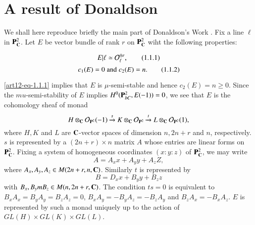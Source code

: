 \section{A result of Donaldson}\label{art12-sec-1}
We shall here reproduce briefly the main part of Donaldson's Work \cite{art12-key1}. Fix a line $\ell$ in $\mathbf{P}_{\mathbf{C}}^{2}$. Let $E$ be vector bundle of rank $r$ on $\mathbf{P}_{\mathbf{C}}^{2}$ wiht the following properties:


\begin{equation}
E|\ell \simeq \mathcal{O}_{\ell}^{\oplus r},\tag{1.1.1} \label{art12-eq-1.1.1}
\end{equation}
\begin{equation}
c_{1} (E) =0 \;{\rm and}\; c_{2}(E) =n.\tag{1.1.2}\label{art12-eq-1.1.2}
\end{equation}

\noindent
\eqref{art12-eq-1.1.1} implies that $E$ is $\mu$-semi-stable and hence $c_{2}(E)= n \geq 0$. Since the $mu$-semi-stability of $E$ implies $H^{0}(\mathbf{P}_{bC}^{2}, E(-1))=0$, we see that $E$ is the cohomology sheaf of monad
$$
H\otimes_{\mathbf{C}} \mathcal{O}_{\mathbf{P}^{2}}(-1)\xrightarrow{s} K \otimes_{\mathbf{C}} \mathcal{O}_{\mathbf{P}^{2}} \xrightarrow{t} L \otimes_{\mathbf{C}} \mathcal{O}_{\mathbf{P}^{2}}(1),
$$
where $H, K$ and $L$ are $\mathbf{C}$-vector spaces of dimension $n,2n +r$ and $n$, respectively. $s$ is represented by a $(2n +r)\times n$ matrix $A$ whose entries are linear forms on $\mathbf{P}_{\mathbf{C}}^{2}$. Fixing a system of homogeneous coordinates
$(x : y : z)$ of $\mathbf{P}_{\mathbf{C}}^{2}$, we may write
$$
A =A_{x}x + A_{y}y +A_{z}Z,
$$
where $A_{x}, A_{y}, A_{z} \in M(2n + r, n, \mathbf{C})$. Similarly $t$ is represented by
$$
B =D_{x}x +B_{y}y +B_{z}z
$$
with $B_{x}, B_{y}m B_{z} \in M(n, 2n + r, \mathbf{C})$. The condition $ts =0$ is equivalent to $B_{x}A_{x}=B_{y}A_{y} = B_{z}A_{z}=0$, $B_{x}A_{y} = -B_{y}A_{z} = -B_{z}A_{y}$ and $B_{z}A_{x} = -B_{x}A_{z}$. $E$ is represented by such a monad uniquely up to the action of $GL(H) \times GL(K) \times GL(L)$.

